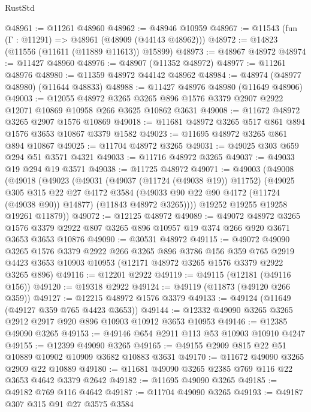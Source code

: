\begin{lexlean}{RustStd}
\begin{coremodule}
@48961 := @11261 @48960
@48962 := @48946 @10959
@48967 := @11543 (fun (Γ : @11291) => @48961 (@48909 (@44143 @48962)))
@48972 := @14823 (@11556 (@11611 (@11889 @11613)) @15899)
@48973 := @48967 @48972
@48974 := @11427 @48960
@48976 := @48907 (@11352 @48972)
@48977 := @11261 @48976
@48980 := @11359 @48972 @44142 @48962
@48984 := @48974 (@48977 @48980) (@11644 @48833)
@48988 := @11427 @48976 @48980 (@11649 @48906)
@49003 := @12055
    @48972
    @3265
    @3265
    @896
    @1576
    @3379
    @2907
    @2922
    @12071
    @10869
    @10958
    @266
    @3625
    @10862
    @3631
@49008 := @11672 @48972 @3265 @2907 @1576 @10869
@49018 := @11681 @48972 @3265 @517 @861 @894 @1576 @3653 @10867 @3379 @1582
@49023 := @11695 @48972 @3265 @861 @894 @10867
@49025 := @11704 @48972 @3265
@49031 := @49025 @303 @659 @294 @51 @3571 @4321
@49033 := @11716 @48972 @3265
@49037 := @49033 @19 @294 @19 @3571
@49038 := @11725 @48972
@49071 := @49003
    (@49008
      (@49018
        (@49023
          (@49031
            (@49037 (@11724 (@49038 @19)) @11752)
            (@49025
              @305
              @315
              @22
              @27
              @4172
              @3584
              (@49033 @90 @22 @90 @4172 (@11724 (@49038 @90)) @14877)
              (@11843 @48972 @3265))))
        @19252
        @19255
        @19258
        @19261
        @11879))
@49072 := @12125 @48972
@49089 := @49072
    @48972
    @3265
    @1576
    @3379
    @2922
    @807
    @3265
    @896
    @10957
    @19
    @374
    @266
    @920
    @3671
    @3653
    @3653
    @10876
@49090 := @30531 @48972
@49115 := @49072
    @49090
    @3265
    @1576
    @3379
    @2922
    @266
    @3265
    @896
    @3786
    @156
    @359
    @765
    @2919
    @4423
    @3653
    @10903
    @10953
    (@12171 @48972 @3265 @1576 @3379 @2922 @3265 @896)
@49116 := @12201 @2922
@49119 := @49115 (@12181 (@49116 @156))
@49120 := @19318 @2922
@49124 := @49119 (@11873 (@49120 @266 @359))
@49127 := @12215 @48972 @1576 @3379
@49133 := @49124 (@11649 (@49127 @359 @765 @4423 @3653))
@49144 := @12332 @49090 @3265 @3265 @2912 @2917 @920 @896 @10903 @10912 @3653 @10953
@49146 := @12385 @49090 @3265
@49153 := @49146 @654 @2911 @113 @53 @10903 @10910 @4247
@49155 := @12399 @49090 @3265
@49165 := @49155 @2909 @815 @22 @51 @10889 @10902 @10909 @3682 @10883 @3631
@49170 := @11672 @49090 @3265 @2909 @22 @10889
@49180 := @11681 @49090 @3265 @2385 @769 @116 @22 @3653 @4642 @3379 @2642
@49182 := @11695 @49090 @3265
@49185 := @49182 @769 @116 @4642
@49187 := @11704 @49090 @3265
@49193 := @49187 @307 @315 @91 @27 @3575 @3584

\end{coremodule}
\end{lexlean}
